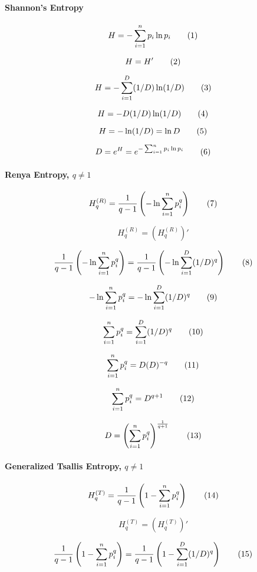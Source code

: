 \paragraph{Shannon's Entropy}
\[
  H =
  - \sum_{i=1}^{n}
  p_i
  \ln p_i
  \addtag
\]

\[
  H = H'
  \addtag
\]

\[
  H
  =
  - \sum_{i=1}^{D}
  (1/D)
  \ln (1/D)
  \addtag
\]

\[
  H
  =
  - D
  (1/D)
  \ln (1/D)
  \addtag
\]

\[
  H
  =
  - \ln (1/D)
  =
  \ln D
  \addtag
\]

\[
  D
  = 
  e^H
  =
  e^{
    - \sum_{i=1}^{n}
    p_i
    \ln p_i
  }
  \addtag
\]

\paragraph{Renya Entropy, $q \neq 1$}
\[
  H_q^{(R)} =
  \frac{1}{q - 1}
  \left(
    - \ln
    \sum_{i=1}^{n}
      p_i^q
  \right)
  \addtag
\]

\[
  H_q^{(R)} = (H_q^{(R)})'
\]

\[
  \frac{1}{q - 1}
  \left(
    - \ln
    \sum_{i=1}^{n}
      p_i^q
  \right)
  =
  \frac{1}{q - 1}
  \left(
    - \ln
    \sum_{i=1}^{D}
      (1/D)^q
  \right)
  \addtag
\]

\[
  - \ln
  \sum_{i=1}^{n}
    p_i^q
  =
  - \ln
  \sum_{i=1}^{D}
    (1/D)^q
  \addtag
\]

\[
  \sum_{i=1}^{n}
    p_i^q
  =
  \sum_{i=1}^{D}
    (1/D)^q
  \addtag
\]

\[
  \sum_{i=1}^{n}
    p_i^q
  =
  D
  (D)^{-q}
  \addtag
\]

\[
  \sum_{i=1}^{n}
    p_i^q
  =
  D^{q + 1}
  \addtag
\]

\[
  D =
  \left(
  \sum_{i=1}^{n}
    p_i^q
  \right)^{
    \frac{1}{q + 1}
  }
  \addtag
\]

\paragraph{Generalized Tsallis Entropy, $q \neq 1$}
\[
  H_q^{(T)} =
  \frac{1}{q - 1}
  \left(
    1 -
    \sum_{i=1}^{n}
      p_i^q
  \right)
  \addtag
\]

\[
  H_q^{(T)} = (H_q^{(T)})'
\]

\[
  \frac{1}{q - 1}
  \left(
    1 -
    \sum_{i=1}^{n}
      p_i^q
  \right)
  =
  \frac{1}{q - 1}
  \left(
    1 -
    \sum_{i=1}^{D}
      (1/D)^q
  \right)
  \addtag
\]

